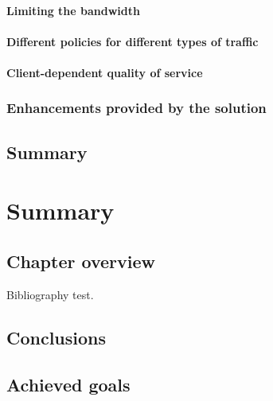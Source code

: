 \documentclass[11pt]{book}
\begin{document}
        \subsubsection{Limiting the bandwidth}
        \label{ssub:}


        \subsubsection{Different policies for different types of traffic}
        \label{ssub:}


        \subsubsection{Client-dependent quality of service}
        \label{ssub:}


      \subsection{Enhancements provided by the solution}
      \label{sub:}


    \section*{Summary}


  \chapter{Summary}

    \section*{Chapter overview}

      Bibliography \cite{mittelbach2004} test.
	
		

    \section{Conclusions}
	
		

    \section{Achieved goals}

		
\end{document}
